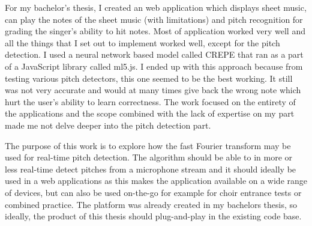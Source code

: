 For my bachelor's thesis, I created an web application which displays sheet music, can play the notes of the sheet music (with limitations) and pitch recognition for grading the singer's ability to hit notes. Most of application worked very well and all the things that I set out to implement worked well, except for the pitch detection. I used a neural network based model called CREPE that ran as a part of a JavaScript library called ml5.js. I ended up with this approach because from testing various pitch detectors, this one seemed to be the best working. It still was not very accurate and would at many times give back the wrong note which hurt the user's ability to learn correctness. The work focused on the entirety of the applications and the scope combined with the lack of expertise on my part made me not delve deeper into the pitch detection part.  

The purpose of this work is to explore how the fast Fourier transform may be used for real-time pitch detection. The algorithm should be able to in more or less real-time detect pitches from a microphone stream and it should ideally be used in a web applications as this makes the application available on a wide range of devices, but can also be used on-the-go for example for choir entrance tests or combined practice. The platform was already created in my bachelors thesis, so ideally, the product of this thesis should plug-and-play in the existing code base.


